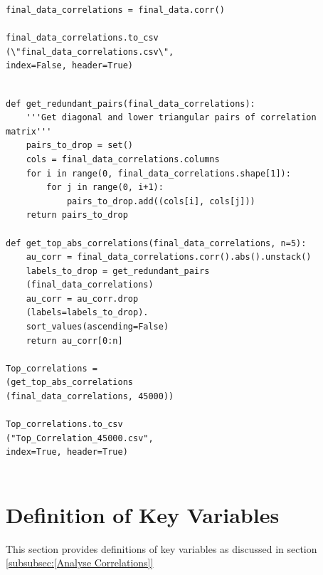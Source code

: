 \documentclass[12pt]{scrartcl}
\begin{document}
\begin{lstlisting}[frame=single,basicstyle=\footnotesize\ttfamily,
  caption={Python - Get Correlations between all Variables},label={list:[Get Correlations between all Variables]}]
final_data_correlations = final_data.corr()

final_data_correlations.to_csv
(\"final_data_correlations.csv\", 
index=False, header=True)


\end{lstlisting}

\begin{lstlisting}[frame=single,basicstyle=\footnotesize\ttfamily,
  caption={Python - Analyse Correlations in Python},label={list:[Analyse Correlations in Python]}]
def get_redundant_pairs(final_data_correlations):
    '''Get diagonal and lower triangular pairs of correlation matrix'''
    pairs_to_drop = set()
    cols = final_data_correlations.columns
    for i in range(0, final_data_correlations.shape[1]):
        for j in range(0, i+1):
            pairs_to_drop.add((cols[i], cols[j]))
    return pairs_to_drop
    
def get_top_abs_correlations(final_data_correlations, n=5):
    au_corr = final_data_correlations.corr().abs().unstack()
    labels_to_drop = get_redundant_pairs
    (final_data_correlations)
    au_corr = au_corr.drop
    (labels=labels_to_drop).
    sort_values(ascending=False)
    return au_corr[0:n]
    
Top_correlations = 
(get_top_abs_correlations
(final_data_correlations, 45000))

Top_correlations.to_csv
("Top_Correlation_45000.csv", 
index=True, header=True)


\end{lstlisting}

\section{Definition of Key Variables}
\label{sec:[Definition of key Variables]}

This section provides definitions of key variables as discussed in section \ref{subsubsec:[Analyse Correlations]}
\end{document}
